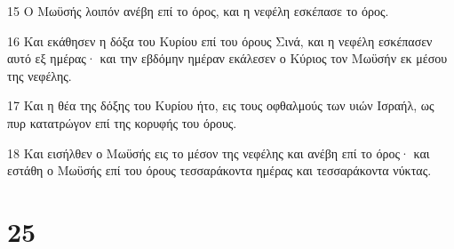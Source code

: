 \par 15 Ο Μωϋσής λοιπόν ανέβη επί το όρος, και η νεφέλη εσκέπασε το όρος.
\par 16 Και εκάθησεν η δόξα του Κυρίου επί του όρους Σινά, και η νεφέλη εσκέπασεν αυτό εξ ημέρας· και την εβδόμην ημέραν εκάλεσεν ο Κύριος τον Μωϋσήν εκ μέσου της νεφέλης.
\par 17 Και η θέα της δόξης του Κυρίου ήτο, εις τους οφθαλμούς των υιών Ισραήλ, ως πυρ κατατρώγον επί της κορυφής του όρους.
\par 18 Και εισήλθεν ο Μωϋσής εις το μέσον της νεφέλης και ανέβη επί το όρος· και εστάθη ο Μωϋσής επί του όρους τεσσαράκοντα ημέρας και τεσσαράκοντα νύκτας.

\chapter{25}

